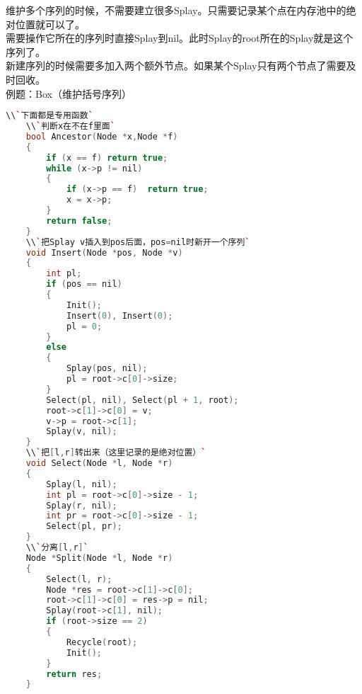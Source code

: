     维护多个序列的时候，不需要建立很多Splay。只需要记录某个点在内存池中的绝对位置就可以了。\\
    需要操作它所在的序列时直接Splay到nil。此时Splay的root所在的Splay就是这个序列了。\\
    新建序列的时候需要多加入两个额外节点。如果某个Splay只有两个节点了需要及时回收。\\
    例题：Box（维护括号序列）\\
    \begin{lstlisting}[language=c++]
    \\`下面都是专用函数`
    \\`判断x在不在f里面`
    bool Ancestor(Node *x,Node *f)
    {
        if (x == f) return true;
        while (x->p != nil)
        {
            if (x->p == f)  return true;
            x = x->p;
        }
        return false;
    }
    \\`把Splay v插入到pos后面，pos=nil时新开一个序列`
    void Insert(Node *pos, Node *v)
    {
        int pl;
        if (pos == nil)
        {
            Init();
            Insert(0), Insert(0);
            pl = 0;
        }
        else
        {
            Splay(pos, nil);
            pl = root->c[0]->size;
        }
        Select(pl, nil), Select(pl + 1, root);
        root->c[1]->c[0] = v;
        v->p = root->c[1];
        Splay(v, nil);
    }
    \\`把[l,r]转出来（这里记录的是绝对位置）`
    void Select(Node *l, Node *r)
    {
		Splay(l, nil);
        int pl = root->c[0]->size - 1;
        Splay(r, nil);
        int pr = root->c[0]->size - 1;
        Select(pl, pr);
    }
    \\`分离[l,r]`
    Node *Split(Node *l, Node *r)
    {
        Select(l, r);
        Node *res = root->c[1]->c[0];
        root->c[1]->c[0] = res->p = nil;
        Splay(root->c[1], nil);
        if (root->size == 2)
        {
            Recycle(root);
            Init();
        }
        return res;
    }


\end{lstlisting}

